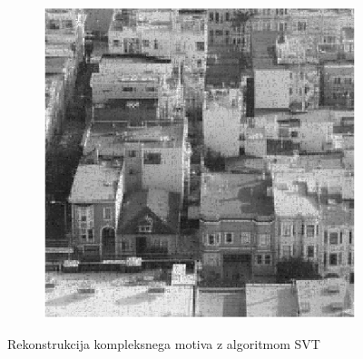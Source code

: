 \begin{figure}
\begin{subfigure}{0.325\linewidth}
    \end{subfigure}
    \hfill
    \begin{subfigure}{0.325\linewidth}
        \includegraphics[width=\linewidth]{Poglavja/Slike/kompleksnost/kompleksna grayscale 300/rez60SVT.png}
    \end{subfigure}
    \caption{Rekonstrukcija kompleksnega motiva z algoritmom SVT}
\end{figure}


